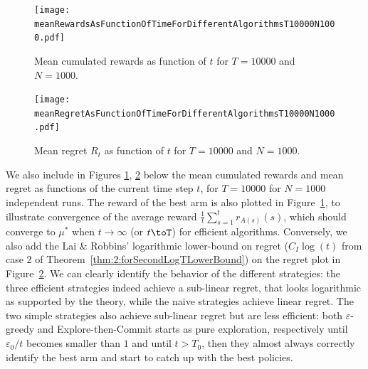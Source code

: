 

\begin{figure}[h!]  %
	\texttt{[image: meanRewardsAsFunctionOfTimeForDifferentAlgorithmsT10000N1000.pdf]}
	\caption{Mean cumulated rewards as function of $t$ for $T=10000$ and $N=1000$.}
	\label{fig:2:meanRewardsAsFunctionOfTimeForDifferentAlgorithmsT10000N1000}
\end{figure}

\begin{figure}[h!]  %
	\texttt{[image: meanRegretAsFunctionOfTimeForDifferentAlgorithmsT10000N1000.pdf]}
	\caption{Mean regret $R_t$ as function of $t$ for $T=10000$ and $N=1000$.}
	\label{fig:2:meanRegretAsFunctionOfTimeForDifferentAlgorithmsT10000N1000}
\end{figure}

We also include in Figures
\ref{fig:2:meanRewardsAsFunctionOfTimeForDifferentAlgorithmsT10000N1000}, \ref{fig:2:meanRegretAsFunctionOfTimeForDifferentAlgorithmsT10000N1000} below the mean cumulated rewards and mean regret as functions of the current time step $t$, for $T=10000$ for $N=1000$ independent runs.
The reward of the best arm is also plotted in Figure~\ref{fig:2:meanRewardsAsFunctionOfTimeForDifferentAlgorithmsT10000N1000}, to illustrate convergence of the average reward $\frac{1}{t} \sum\limits_{s=1}^t r_{A(s)}(s)$, which should converge to $\mu^*$ when $t\to\infty$ (or $t\toT$) for efficient algorithms.
Conversely, we also add the Lai \& Robbins' logarithmic lower-bound on regret ($C_I \log(t)$ from case 2 of Theorem~\ref{thm:2:forSecondLogTLowerBound}) on the regret plot in Figure~\ref{fig:2:meanRegretAsFunctionOfTimeForDifferentAlgorithmsT10000N1000}.
%
We can clearly identify the behavior of the different strategies:
the three efficient strategies indeed achieve a sub-linear regret, that looks logarithmic as supported by the theory,
while the naive strategies achieve linear regret.
The two simple strategies also achieve sub-linear regret but are less efficient:
both $\varepsilon$-greedy and Explore-then-Commit starts as pure exploration, respectively until $\varepsilon_0/t$ becomes smaller than $1$ and until $t > T_0$, then they almost always correctly identify the best arm and start to catch up with the best policies.



